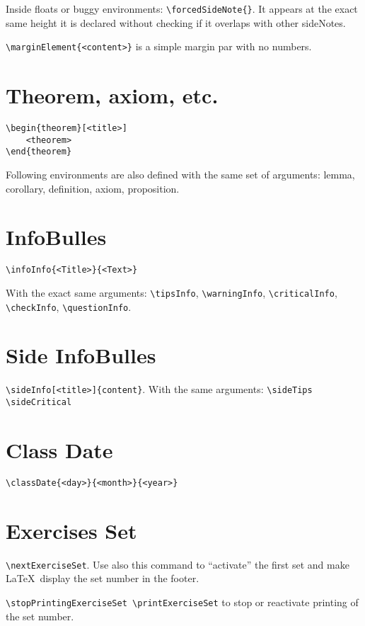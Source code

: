 \documentclass[a4paper, 11pt, oneside, fleqn]{article}
\begin{document}
\begin{multicols}{2}
		Inside floats or buggy environments: \lstinline[breaklines]|\forcedSideNote{}|. It appears at the exact same height it is declared without checking if it overlaps with other sideNotes.
		
		\lstinline[breaklines]|\marginElement{<content>}| is a simple margin par with no numbers.
		
		
		\section{Theorem, axiom, etc.}
		\begin{lstlisting}[breaklines]
\begin{theorem}[<title>]
	<theorem>
\end{theorem}
		\end{lstlisting}
		
		Following environments are also defined with the same set of arguments: lemma, corollary, definition, axiom, proposition.
		
		
		\section{InfoBulles}
		\verb|\infoInfo{<Title>}{<Text>}|
		
		With the exact same arguments: \verb|\tipsInfo|, \verb|\warningInfo|, \verb|\criticalInfo|,
		\verb|\checkInfo|, \verb|\questionInfo|.
		
		
		\section{Side InfoBulles}
		\lstinline[breaklines]|\sideInfo[<title>]{content}|. With the same arguments: \lstinline[breaklines]|\sideTips \sideCritical|
		
		
		\section{Class Date}
		\lstinline[breaklines]|\classDate{<day>}{<month>}{<year>}|
		
		
		\section{Exercises Set}
		\lstinline[breaklines]|\nextExerciseSet|. Use also this command to \enquote{activate} the first set and make \LaTeX\ display the set number in the footer.
		
		\lstinline[breaklines]|\stopPrintingExerciseSet \printExerciseSet| to stop or reactivate printing of the set number.
		

\end{multicols}
\end{document}
